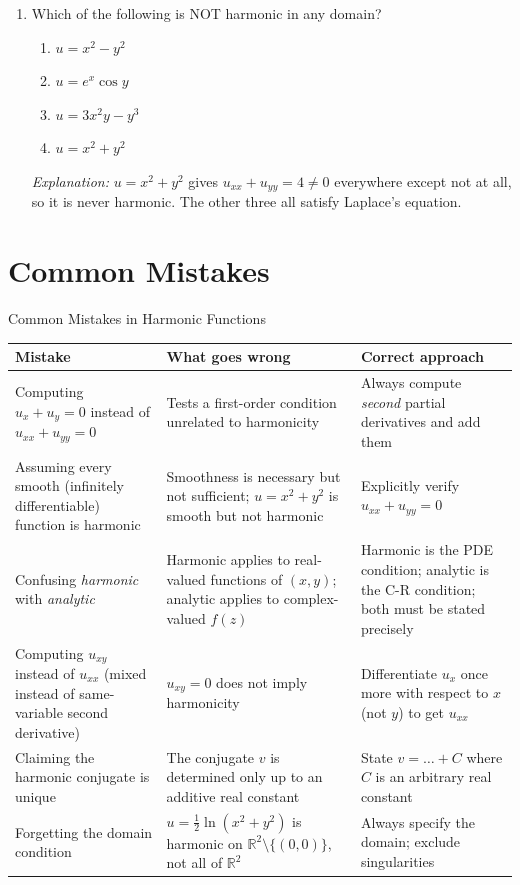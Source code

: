 \documentclass[12pt,a4paper]{article}
\begin{document}
\begin{enumerate}
\item Which of the following is NOT harmonic in any domain?
\begin{enumerate}[label=(\alph*)]
  \item $u=x^{2}-y^{2}$
  \item $u=e^{x}\cos y$
  \item $u=3x^{2}y-y^{3}$
  \item \textbf{$u=x^{2}+y^{2}$}
\end{enumerate}
\textit{Explanation:} $u=x^{2}+y^{2}$ gives $u_{xx}+u_{yy}=4\neq 0$ everywhere except not at
all, so it is never harmonic. The other three all satisfy Laplace's equation.

\end{enumerate}

\section{Common Mistakes}

\begin{mistakebox}{Common Mistakes in Harmonic Functions}
\begin{tabular}{@{}p{5cm}p{5.5cm}p{4.5cm}@{}}
\toprule
\textbf{Mistake} & \textbf{What goes wrong} & \textbf{Correct approach} \\
\midrule
Computing $u_{x}+u_{y}=0$ instead of $u_{xx}+u_{yy}=0$
  & Tests a first-order condition unrelated to harmonicity
  & Always compute \emph{second} partial derivatives and add them \\
\midrule
Assuming every smooth (infinitely differentiable) function is harmonic
  & Smoothness is necessary but not sufficient; $u=x^{2}+y^{2}$ is smooth but not harmonic
  & Explicitly verify $u_{xx}+u_{yy}=0$ \\
\midrule
Confusing \emph{harmonic} with \emph{analytic}
  & Harmonic applies to real-valued functions of $(x,y)$; analytic applies to complex-valued $f(z)$
  & Harmonic is the PDE condition; analytic is the C-R condition; both must be stated precisely \\
\midrule
Computing $u_{xy}$ instead of $u_{xx}$ (mixed instead of same-variable second derivative)
  & $u_{xy}=0$ does not imply harmonicity
  & Differentiate $u_{x}$ once more with respect to $x$ (not $y$) to get $u_{xx}$ \\
\midrule
Claiming the harmonic conjugate is unique
  & The conjugate $v$ is determined only up to an additive real constant
  & State $v=\ldots + C$ where $C$ is an arbitrary real constant \\
\midrule
Forgetting the domain condition
  & $u=\tfrac{1}{2}\ln(x^{2}+y^{2})$ is harmonic on $\mathbb{R}^{2}\setminus\{(0,0)\}$, not all of $\mathbb{R}^{2}$
  & Always specify the domain; exclude singularities \\
\bottomrule
\end{tabular}
\end{mistakebox}
\end{document}
